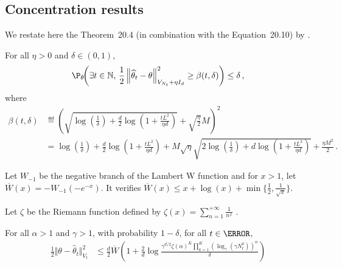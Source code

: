 \subsection{Concentration results}\label{app:lgc.lemmas.concentration}

We restate here the Theorem~20.4 (in combination with the Equation~20.10) by \citet{lattimore2018bandits}.
\begin{theorem}
\label{th:confidence_beta}
For all $\eta >0$ and $\delta\in(0,1)$,
\[
\P_{\theta}\!\!\left(\exists t\in\NN,\, \frac{1}{2}\normm{\htheta_t-\theta}^2_{V_{N_t}+\eta I_d} \geq \beta(t,\delta)\right) \leq \delta\,,
 \]
 where
 \begin{align*}
\beta(t,\delta) &\eqdef  \left( \sqrt{\log\!\left( \frac{1}{\delta}\right)+\frac{d}{2}\log\!\left(1+\frac{t L^2}{\eta d} \right)} +\sqrt{\frac{\eta}{2}}M\right)^2\\
&=\log\!\left( \frac{1}{\delta}\right)+\frac{d}{2}\log\!\left(1+\frac{t L^2}{\eta d} \right) +  M\sqrt{\eta}\sqrt{2\log\!\left( \frac{1}{\delta}\right)+d\log\!\left(1+\frac{t L^2}{\eta d} \right)}+\frac{\eta M^2}{2}\,.
\end{align*}
\end{theorem}


\iffalse
Let $W_{-1}$ be the negative branch of the Lambert W function and for $x>1$, let $\overline{W}(x) = -W_{-1}(-e^{-x})$. It verifies $\overline{W}(x) \le x + \log(x) + \min\{\frac{1}{2}, \frac{1}{\sqrt{x}}\}$.

Let $\zeta$ be the Riemann function defined by $\zeta(x) = \sum_{n=1}^{+\infty}\frac{1}{n^x}$ .

\begin{theorem}\label{thm:maximal_concentration_inequality}
For all $\alpha>1$ and $\gamma>1$, with probability $1-\delta$, for all $t\in \N$,
\begin{align*}
\frac{1}{2} \Vert \theta - \hat{\theta}_t \Vert_{V_t}^2
&\le \frac{d}{2} \overline{W}\left( 1 + \frac{2}{d}\log \frac{\gamma^{d/2}\zeta(\alpha)^K\prod_{k=1}^K(\log_\gamma(\gamma N_t^k))^\alpha}{\delta} \right)
\end{align*}
\end{theorem}


